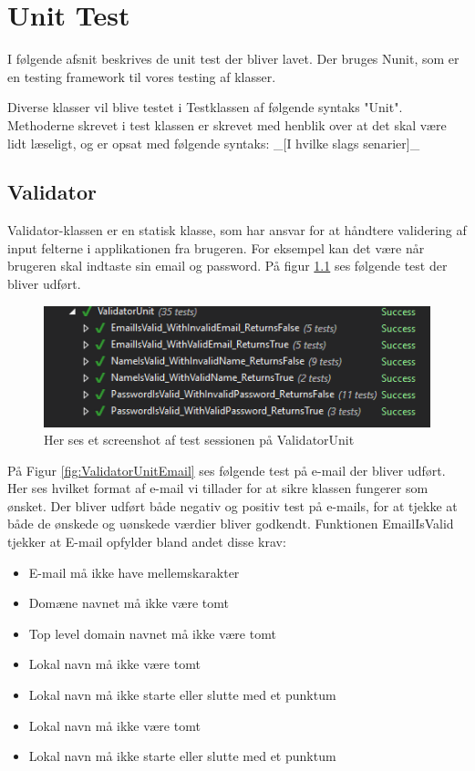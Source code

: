 \chapter{Unit Test}
I følgende afsnit beskrives de unit test der bliver lavet. Der bruges Nunit\cite{NUnit}, som er en testing framework til vores testing af klasser. 

Diverse klasser vil blive testet i Testklassen af følgende syntaks "Unit". Methoderne skrevet i test klassen er skrevet med henblik over at det skal være lidt læseligt, og er opsat med følgende syntaks: 
\_[I hvilke slags senarier]\_ 

\section{Validator}
Validator-klassen er en statisk klasse, som har ansvar for at håndtere validering af input felterne i applikationen fra brugeren. For eksempel kan det være når brugeren skal indtaste sin email og password. På figur \ref{fig:ValidatorUnit} ses følgende test der bliver udført.
\begin{figure}[H]
	\centering
	\includegraphics[width=0.6\linewidth]{Unit/ValidatorUnit.PNG}
	\caption{Her ses et screenshot af test sessionen på ValidatorUnit}
	\label{fig:ValidatorUnit}
\end{figure}

\clearpage

På Figur \ref{fig:ValidatorUnitEmail} ses følgende test på e-mail der bliver udført. Her ses hvilket format af e-mail vi tillader for at sikre klassen fungerer som ønsket.
Der bliver udført både negativ og positiv test på e-mails, for at tjekke at både de ønskede og uønskede værdier bliver godkendt. Funktionen EmailIsValid tjekker at E-mail opfylder bland andet disse krav:\\
\begin{itemize}
	\item E-mail må ikke have mellemskarakter
	\item Domæne navnet må ikke være tomt
	\item Top level domain navnet\cite{TLD} må ikke være tomt
	\item Lokal navn må ikke være tomt
	\item Lokal navn må ikke starte eller slutte med et punktum
	\item Lokal navn må ikke være tomt
	\item Lokal navn må ikke starte eller slutte med et punktum
	
\end{itemize}

